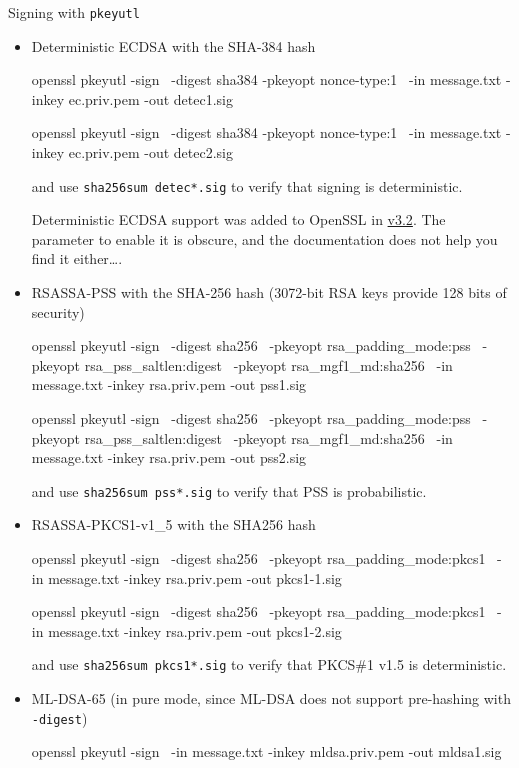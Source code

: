 \documentclass{practice}
\begin{document}
\begin{task}{Signing with \texttt{pkeyutl}}
\begin{itemize}
    \item Deterministic ECDSA with the SHA-384 hash
    \begin{cmdblock}
openssl pkeyutl -sign \
  -digest sha384 -pkeyopt nonce-type:1 \
  -in message.txt -inkey ec.priv.pem -out detec1.sig

openssl pkeyutl -sign \
  -digest sha384 -pkeyopt nonce-type:1 \
  -in message.txt -inkey ec.priv.pem -out detec2.sig
    \end{cmdblock}
    and use \texttt{sha256sum detec*.sig} to verify that signing is deterministic.

    Deterministic ECDSA support was added to OpenSSL in \href{https://openssl-library.org/news/openssl-3.2-notes\#major-changes-between-openssl-31-and-openssl-320-23-nov-2023}{v3.2}.
    The parameter to enable it is obscure, and the documentation does not help you find it either\dots.

    \item RSASSA-PSS with the SHA-256 hash (3072-bit RSA keys provide 128 bits of security)
    \begin{cmdblock}
openssl pkeyutl -sign \
  -digest sha256 \
  -pkeyopt rsa_padding_mode:pss \
  -pkeyopt rsa_pss_saltlen:digest \
  -pkeyopt rsa_mgf1_md:sha256 \
  -in message.txt -inkey rsa.priv.pem -out pss1.sig

openssl pkeyutl -sign \
  -digest sha256 \
  -pkeyopt rsa_padding_mode:pss \
  -pkeyopt rsa_pss_saltlen:digest \
  -pkeyopt rsa_mgf1_md:sha256 \
  -in message.txt -inkey rsa.priv.pem -out pss2.sig
    \end{cmdblock}
    and use \texttt{sha256sum pss*.sig} to verify that PSS is probabilistic.

    \item RSASSA-PKCS1-v1\_5 with the SHA256 hash
    \begin{cmdblock}
openssl pkeyutl -sign \
  -digest sha256 \
  -pkeyopt rsa_padding_mode:pkcs1 \
  -in message.txt -inkey rsa.priv.pem -out pkcs1-1.sig

openssl pkeyutl -sign \
  -digest sha256 \
  -pkeyopt rsa_padding_mode:pkcs1 \
  -in message.txt -inkey rsa.priv.pem -out pkcs1-2.sig
    \end{cmdblock}

    and use \texttt{sha256sum pkcs1*.sig} to verify that PKCS\#1 v1.5 is deterministic.

    \item ML-DSA-65 (in pure mode, since ML-DSA does not support pre-hashing with \texttt{-digest})
    \begin{cmdblock}
openssl pkeyutl -sign \
  -in message.txt -inkey mldsa.priv.pem -out mldsa1.sig


\end{cmdblock}
\end{itemize}
\end{task}
\end{document}
